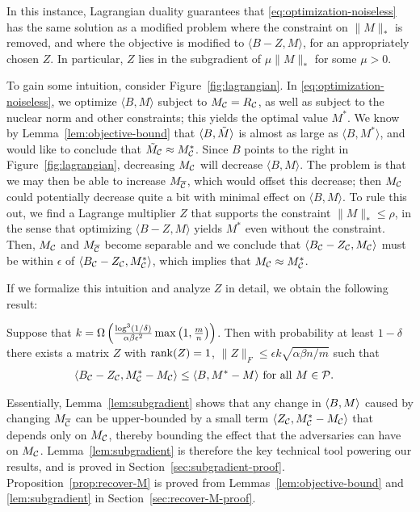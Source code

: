 

In this instance, 
Lagrangian duality guarantees that \eqref{eq:optimization-noiseless} has the 
same solution as a modified problem where the constraint on $\|M\|_*$ is removed, 
and where the objective is modified to $\langle B - Z, M \rangle$, for an 
appropriately chosen $Z$. In particular, $Z$ lies in the subgradient of 
$\mu \|M\|_*$ for some $\mu > 0$.

To gain some intuition, consider 
Figure~\ref{fig:lagrangian}. In \eqref{eq:optimization-noiseless}, we optimize 
$\langle B, M \rangle$ subject to $M_{\mathcal{C}} = R_{\mathcal{C}}$, as well as subject to 
the nuclear norm and other constraints; this yields the optimal value $M^*$. 
We know by Lemma~\ref{lem:objective-bound} that $\langle B, \tilde{M} \rangle$ is almost 
as large as $\langle B, M^* \rangle$, and would like to conclude that 
$\tilde{M}_{\mathcal{C}} \approx M^*_{\mathcal{C}}$. Since $B$ points to the right in Figure~\ref{fig:lagrangian}, 
decreasing $M_{\mathcal{C}}$ will decrease $\langle B, M \rangle$. The problem is that 
we may then be able to increase $M_{\overline{\mathcal{C}}}$, which would offset 
this decrease; then $M_{\mathcal{C}}$ could potentially decrease quite a 
bit with minimal effect on $\langle B, M \rangle$. 
To rule this out, we find a Lagrange 
multiplier $Z$ that supports 
the constraint $\|M\|_* \leq \rho$, in the sense that optimizing 
$\langle B-Z, M \rangle$ yields $M^*$ even without the constraint. 
Then, $M_{\mathcal{C}}$ and $M_{\overline{\mathcal{C}}}$ become separable and we conclude that 
$\langle B_{\mathcal{C}} - Z_{\mathcal{C}}, M_{\mathcal{C}} \rangle$ must be within $\epsilon$ of 
$\langle B_{\mathcal{C}} - Z_{\mathcal{C}}, M^*_{\mathcal{C}} \rangle$, which implies that 
$M_{\mathcal{C}} \approx M^*_{\mathcal{C}}$.

If we formalize this intuition and analyze $Z$ in detail, we obtain the 
following result:
\begin{lemma}
\label{lem:subgradient}
Suppose that $k = \Omega\left( \frac{\log^3(1/\delta)}{\alpha\beta\epsilon^2}\max\left( 1,\frac{m}{n} \right) \right)$. 
Then with probability at least $1-\delta$ there exists a matrix $Z$ with 
$\operatorname{rank}(Z) = 1$, $\|Z\|_F \leq \epsilon k\sqrt{\alpha\beta n/m}$ such that
\begin{align}
\langle B_{\mathcal{C}} - Z_{\mathcal{C}}, M^*_{\mathcal{C}} - M_{\mathcal{C}} \rangle &\leq \langle B, M^* - M \rangle \text{ for all $M \in \mathcal{P}$}.
\end{align}
\end{lemma}
Essentially, Lemma~\ref{lem:subgradient} shows that any change in 
$\langle B, M \rangle$ caused by changing $M_{\overline{\mathcal{C}}}$ can be upper-bounded 
by a small term $\langle Z_{\mathcal{C}}, M^*_{\mathcal{C}} - M_{\mathcal{C}} \rangle$ that depends only 
on $M_{\mathcal{C}}$, thereby bounding the effect that the adversaries can have 
on $M_{\mathcal{C}}$. Lemma~\ref{lem:subgradient} is therefore the key 
technical tool powering our results, and is proved in 
Section~\ref{sec:subgradient-proof}. Proposition~\ref{prop:recover-M} 
is proved from Lemmas~\ref{lem:objective-bound} and \ref{lem:subgradient} 
in Section~\ref{sec:recover-M-proof}.


